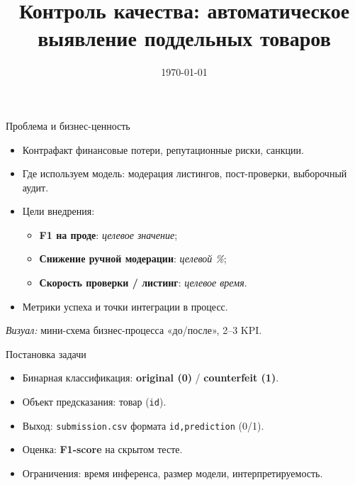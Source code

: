 \documentclass[aspectratio=169,10pt]{beamer}
\title{Контроль качества: автоматическое выявление поддельных товаров}
\date{\today}
\newcommand{\kpi}[2]{\textbf{#1}: #2} %
\begin{document}
\begin{frame}
  \titlepage
\end{frame}

\begin{frame}{Проблема и бизнес-ценность}
\begin{itemize}
  \item Контрафакт \textrightarrow{} финансовые потери, репутационные риски, санкции.
  \item Где используем модель: модерация листингов, пост-проверки, выборочный аудит.
  \item Цели внедрения:
    \begin{itemize}
      \item \kpi{F1 на проде}{\textit{целевое значение}};
      \item \kpi{Снижение ручной модерации}{\textit{целевой \%}};
      \item \kpi{Скорость проверки / листинг}{\textit{целевое время}}.
    \end{itemize}
  \item Метрики успеха и точки интеграции в процесс.
\end{itemize}
\medskip
\textit{Визуал:} мини-схема бизнес-процесса «до/после», 2–3 KPI.
\end{frame}

\begin{frame}{Постановка задачи}
\begin{itemize}
  \item Бинарная классификация: \textbf{original (0)} / \textbf{counterfeit (1)}.
  \item Объект предсказания: товар (\texttt{id}).
  \item Выход: \texttt{submission.csv} формата \texttt{id,prediction} (0/1).
  \item Оценка: \textbf{F1-score} на скрытом тесте.
  \item Ограничения: время инференса, размер модели, интерпретируемость.
\end{itemize}
\medskip
\end{frame}
\end{document}
